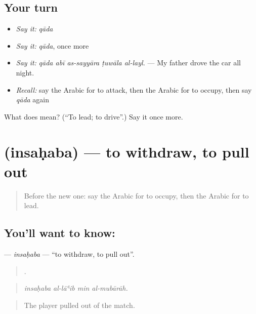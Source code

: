\subsection*{Your turn}
\begin{itemize}
\raggedright
  \item \emph{Say it:} \emph{qāda}
  \item \emph{Say it:} \emph{qāda}, once more
  \item \emph{Say it:} \emph{qāda abī as-sayyāra ṭuwāla al-layl.} — My father drove the car all night.
  \item \emph{Recall:} say the Arabic for to attack, then the Arabic for to occupy, then say \emph{qāda} again
\end{itemize}

\begin{tcolorbox}[breakable,colback=teal!4,colframe=teal!35!black,title={Before you move on}]
What does  mean? (\textquotedblleft{}To lead; to drive\textquotedblright{}.) Say it once more.
\end{tcolorbox}
\section[\texorpdfstring{\ar{انسحب} (insaḥaba)}{انسحب (insaḥaba)}]{ (insaḥaba) — to withdraw, to pull out}

\label{lesson:AR-C339-insahaba}



\begin{quote}
Before the new one: say the Arabic for to occupy, then the Arabic for to lead.
\end{quote}

\subsection*{You'll want to know: }
\textbf{} — \emph{insaḥaba} — \textquotedblleft{}to withdraw, to pull out\textquotedblright{}.

\begin{quote}
   .
\end{quote}

\begin{quote}
\emph{insaḥaba al-lāʿib min al-mubārāh.}
\end{quote}

\begin{quote}
The player pulled out of the match.
\end{quote}

